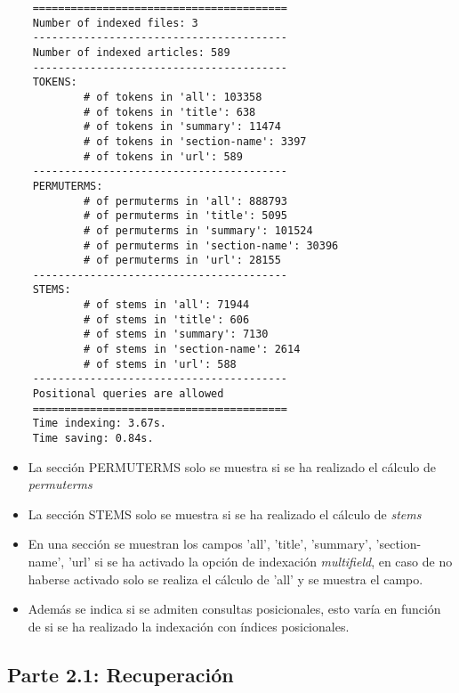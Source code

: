 \documentclass[12pt,a4paper]{article}
\begin{document}
\begin{verbatim}
    ========================================
    Number of indexed files: 3
    ----------------------------------------
    Number of indexed articles: 589
    ----------------------------------------
    TOKENS:
            # of tokens in 'all': 103358
            # of tokens in 'title': 638
            # of tokens in 'summary': 11474
            # of tokens in 'section-name': 3397
            # of tokens in 'url': 589
    ----------------------------------------
    PERMUTERMS:
            # of permuterms in 'all': 888793
            # of permuterms in 'title': 5095
            # of permuterms in 'summary': 101524
            # of permuterms in 'section-name': 30396
            # of permuterms in 'url': 28155
    ----------------------------------------
    STEMS:
            # of stems in 'all': 71944
            # of stems in 'title': 606
            # of stems in 'summary': 7130
            # of stems in 'section-name': 2614
            # of stems in 'url': 588
    ----------------------------------------
    Positional queries are allowed
    ========================================
    Time indexing: 3.67s.
    Time saving: 0.84s.
\end{verbatim}

\begin{itemize}
  \item La sección PERMUTERMS solo se muestra si se ha realizado el cálculo de \textit{permuterms}
  \item La sección STEMS solo se muestra si se ha realizado el cálculo de \textit{stems}
  \item En una sección se muestran los campos 'all', 'title', 'summary', 'section-name', 'url' si se ha activado la opción de indexación \textit{multifield}, en caso de no haberse activado solo se realiza el cálculo de 'all' y se muestra el campo.
  \item Además se indica si se admiten consultas posicionales, esto varía en función de si se ha realizado la indexación con índices posicionales. 
\end{itemize}

\subsection{Parte 2.1: Recuperación}
\end{document}
